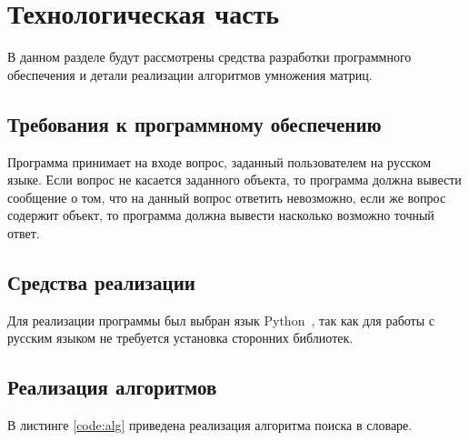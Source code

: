 \section{Технологическая часть}

В данном разделе будут рассмотрены средства разработки программного
обеспечения и детали реализации алгоритмов умножения матриц.

\subsection{Требования к программному обеспечению}
Программа принимает на входе вопрос, заданный пользователем на русском языке. Если вопрос не касается заданного объекта, то программа должна вывести сообщение о том, что на данный вопрос ответить невозможно, если же вопрос содержит объект, то программа должна вывести насколько возможно точный ответ.


\subsection{Средства реализации}
Для реализации программы был выбран язык Python~\cite{python}, так как для работы с русским языком не требуется установка сторонних библиотек.

\subsection{Реализация алгоритмов}

В листинге \ref{code:alg} приведена реализация алгоритма поиска в словаре.

\newpage
{}
